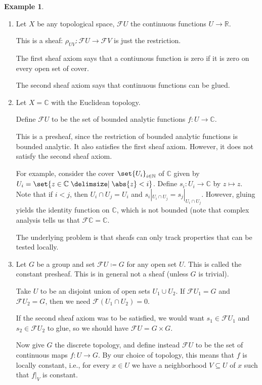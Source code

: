 \documentclass[a4paper]{amsbook}
\theoremstyle{definition}
\newtheorem*{example*}{Example}
\DeclarePairedDelimiter\abs\lvert\rvert
\begin{document}
\begin{example*}
\label{ExamplesOfSheaves}
\begin{enumerate}
	\item Let  $X$ be any topological space, $\mathcal{F}U$ the continuous functions $U\to \mathbb{R}$.

		This is a sheaf: $\rho_{UV}\colon \mathcal{F}U\to \mathcal{F}V$ is just the restriction.

		The first sheaf axiom says that a contiunous function is zero if it is zero on every open set
		of cover.

		The second sheaf axiom says that continuous functions can be glued.

	\item Let $X = \mathbb{C}$ with the Euclidean topology.

		Define $\mathcal{F}U$ to be the set of bounded analytic functions $f\colon U\to \mathbb{C}$.

		This is a presheaf, since the restriction of bounded analytic functions is
		bounded analytic. It also satisfies the first sheaf axiom. However, it does not
		satisfy the second sheaf axiom.

		For example, consider the cover $\set{U_i}_{i \in \mathbb{N}}$ of $\mathbb{C}$ given
		by $U_i = \set{z \in \mathbb{C}\given \abs{z}<i}$. Define $s_i\colon U_i\to \mathbb{C}$
		by $z\mapsto z$. Note that if $i < j$, then $U_i\cap U_j = U_i$ and
		$s_i|_{U_i\cap U_j} = s_j|_{U_i\cap U_j}$. However, gluing yields the identity
		function on $\mathbb{C}$, which is not bounded (note that complex analysis tells
		us that $\mathcal{F}\mathbb{C} = \mathbb{C}$.

		The underlying problem is that sheafs can only track properties that can be tested
		locally.

	\item Let $G$ be a group and set $\mathcal{F}U \coloneqq G$ for any open set $U$.
		This is called the constant presheaf. This is in general not a sheaf (unless $G$ is trivial).

		Take $U$ to be an disjoint union of open sets $U_1 \cup U_2$. If $\mathcal{F}U_1 = G$ and
		$\mathcal{F}U_2 = G$, then we need $\mathcal{F}(U_1\cap U_2) = 0$.

		If the second sheaf axiom was to be satisfied, we would want $s_1 \in \mathcal{F}U_1$ and
		$s_2 \in \mathcal{F}U_2$ to glue, so we should have $\mathcal{F}U = G\times G$.

		Now give $G$ the discrete topology, and define instead $\mathcal{F}U$ to be the set
		of continuous maps $f\colon U\to G$. By our choice of topology, this means that $f$
		is locally constant, i.e., for every $x \in U$ we have a neighborhood $V\subseteq U$ of $x$
		such that  $f|_V$ is constant.


\end{enumerate}
\end{example*}
\end{document}
